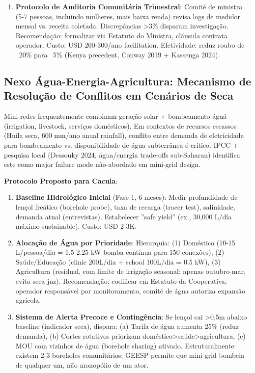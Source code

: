 \documentclass[12pt, a4paper]{article}
\begin{document}
{{{{{{{{{{{{\begin{enumerate}
\item \textbf{Protocolo de Auditoria Comunitária Trimestral}: Comité de ministra (5-7 pessoas, incluindo mulheres, mais baixa renda) revisa logs de medidor mensal vs. receita coletada. Discrepâncias >3\% disparam investigação. Recomendação: formalizar via Estatuto do Ministra, cláusula contrata operador. Custo: USD 200-300/ano facilitation. Efetividade: reduz roubo de ~20\% para ~5\% (Kenya precedent, Conway 2019 + Kassenga 2024).

\end{enumerate}

\subsection{Nexo Água-Energia-Agricultura: Mecanismo de Resolução de Conflitos em Cenários de Seca}

Mini-redes frequentemente combinam geração solar + bombeamento águá (irrigation, livestock, serviços domésticos). Em contextos de recursos escassos (Huíla seca, 600 mm/ano anual rainfall), conflito entre demanda de eletricidade para bombeamento vs. disponibilidade de água subterrânea é crítico. IPCC + pesquisa local (Dessouky 2024, água/energia trade-offs sub-Saharan) identifica este como major failure mode não-abordado em mini-grid design.

\textbf{Protocolo Proposto para Cacula}:

\begin{enumerate}
\item \textbf{Baseline Hidrológico Inicial} (Fase 1, 6 meses): Medir profundidade de lençol freático (borehole probe), taxa de recarga (tracer test), salinidade, demanda atual (entrevistas). Estabelecer ''safe yield'' (ex., 30,000 L/día máximo sustainable). Custo: USD 2-3K.

\item \textbf{Alocação de Água por Prioridade}: Hierarquia: (1) Doméstico (10-15 L/pessoa/dia = 1.5-2.25 kW bomba contínua para 150 conexões), (2) Saúde/Educação (clinic 200L/dia + school 100L/dia = 0.5 kW), (3) Agricultura (residual, com limite de irrigação seasonal: apenas outubro-mar, evita seca juz). Recomendação: codificar em Estatuto da Cooperativa; operador responsável por monitoramento, comité de água autoriza expansão agrícola.

\item \textbf{Sistema de Alerta Precoce e Contingência}: Se lençol cai >0.5m abaixo baseline (indicador seca), dispara: (a) Tarifa de água aumenta 25\% (reduz demanda), (b) Cortes rotativos priorizam doméstico>saúde>agricultura, (c) MOU com vizinhos de água (borehole sharing) ativado. Estruturalmente: existem 2-3 boreholes comunitários; GEESP permite que mini-grid bombeia de qualquer um, não monopólio de um ator.


\end{enumerate}}}}}}}}}}}}}
\end{document}
